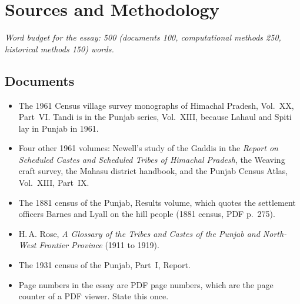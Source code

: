 \documentclass[11pt,a4paper]{article}
\newcommand{\cit}[1]{{\small(#1)}}
\newcommand{\budget}[1]{\par\noindent\textit{Word budget for the essay: #1 words.}\par\smallskip}
\begin{document}
\section{Sources and Methodology}
\budget{500 (documents 100, computational methods 250, historical methods 150)}

\subsection{Documents}
\begin{itemize}
\item The 1961 Census village survey monographs of Himachal Pradesh, Vol.~XX,
  Part~VI\@. Tandi is in the Punjab series, Vol.~XIII, because Lahaul and Spiti
  lay in Punjab in 1961.
\item Four other 1961 volumes: Newell's study of the Gaddis in the
  \emph{Report on Scheduled Castes and Scheduled Tribes of Himachal Pradesh},
  the Weaving craft survey, the Mahasu district handbook, and the Punjab
  Census Atlas, Vol.~XIII, Part~IX.
\item The 1881 census of the Punjab, Results volume, which quotes the
  settlement officers Barnes and Lyall on the hill people \cit{1881 census,
  PDF p.~275}.
\item H.\,A. Rose, \emph{A Glossary of the Tribes and Castes of the Punjab and
  North-West Frontier Province} (1911 to 1919).
\item The 1931 census of the Punjab, Part~I, Report.
\item Page numbers in the essay are PDF page numbers, which are the page
  counter of a PDF viewer. State this once.
\end{itemize}
\end{document}
